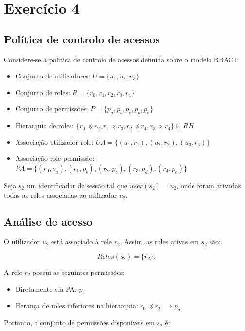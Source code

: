 \chapter{Exercício 4}
\label{cha:exercise_4}

\section{Política de controlo de acessos}

Considere-se a política de controlo de acessos definida sobre o modelo RBAC1:

\begin{itemize}
    \item Conjunto de utilizadores: \(U = \{u_1,u_2,u_3\}\)
    \item Conjunto de roles: \(R = \{r_0,r_1,r_2,r_3,r_4\}\)
    \item Conjunto de permissões: \(P = \{p_a,p_b,p_c,p_d,p_e\}\)
    \item Hierarquia de roles: \(\{r_0 \preceq r_2, r_1 \preceq r_3, r_2 \preceq r_4, r_3 \preceq r_4\} \subseteq RH\)
    \item Associação utilizador-role: \(UA = \{(u_1,r_1),(u_2,r_2),(u_3,r_4)\}\)
    \item Associação role-permissão: \(PA = \{(r_0,p_a),(r_1,p_b),(r_2,p_c),(r_3,p_d),(r_4,p_e)\}\)
\end{itemize}

Seja \(s_2\) um identificador de sessão tal que \(user(s_2) = u_2\), onde foram ativadas todas as roles associadas ao utilizador \(u_2\).

\section{Análise de acesso}

O utilizador \(u_2\) está associado à role \(r_2\). Assim, as roles ativas em \(s_2\) são:

\[
Roles(s_2) = \{r_2\}.
\]

A role \(r_2\) possui as seguintes permissões:

\begin{itemize}
    \item Diretamente via PA: \(p_c\)
    \item Herança de roles inferiores na hierarquia: \(r_0 \preceq r_2 \implies p_a\)
\end{itemize}

Portanto, o conjunto de permissões disponíveis em \(s_2\) é:

